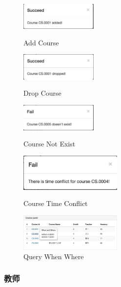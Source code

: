 \documentclass[a4paper, 11pt, nofonts, nocap, fancyhdr]{ctexart}
\begin{document}
\begin{figure}[ht]
		\begin{minipage}{0.3\textwidth}
			\centering
			\includegraphics[width=1.5in]{add}
			\caption{Add Course}
		\end{minipage}%
		\begin{minipage}{0.4\textwidth}
			\centering
			\includegraphics[width=1.5in]{drop}
			\caption{Drop Course}
		\end{minipage}%
		\begin{minipage}{0.3\textwidth}
			\centering
			\includegraphics[width=1.5in]{notexist}
			\caption{Course Not Exist}
		\end{minipage}

		\vspace{0.8cm}

		\begin{minipage}{0.4\textwidth}
			\centering
			\includegraphics[width=2in]{timeconflict}
			\caption{Course Time Conflict}
		\end{minipage}%
		\begin{minipage}{0.6\textwidth}
			\centering
			\includegraphics[width=2in]{showtime}
			\caption{Query When Where}
		\end{minipage}

		\vspace{0.8cm}
	\end{figure}

\newpage
\subsubsection{教师}
\end{document}
